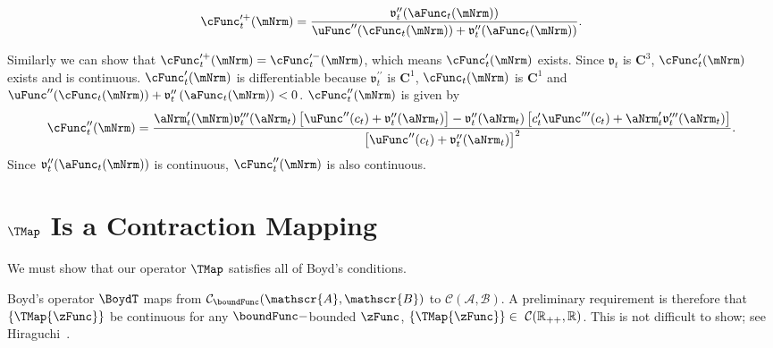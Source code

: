 \documentclass[\econtexRoot/BufferStockTheory]{subfiles}
\begin{document}
\begin{equation*}
  \cFunc_{t}^{\prime +}(\mNrm)=\frac{\mathfrak{v}_{t}^{\prime \prime }({\aFunc}_{t}(\mNrm))}{\uFunc^{\prime \prime
    }(\cFunc_{t}(\mNrm))+\mathfrak{v}_{t}^{\prime \prime }({\aFunc}_{t}(\mNrm))}.
\end{equation*}

Similarly we can show that $\cFunc_{t}^{\prime +}(\mNrm)=\cFunc_{t}^{\prime -}(\mNrm)$,
which means $\cFunc_{t}^{\prime }(\mNrm)$ exists. Since $\mathfrak{v}_{t}$ is
$\mathbf{C}^{3}$, $ \cFunc_{t}^{\prime }(\mNrm)$ exists and is continuous.
$\cFunc_{t}^{\prime }(\mNrm)$ is differentiable because
$\mathfrak{v}_{t}^{\prime \prime }$ is $\mathbf{C}^{1}$, $ \cFunc_{t}(\mNrm)$
is $\mathbf{C}^{1}$ and $\uFunc^{\prime \prime
}(\cFunc_{t}(\mNrm))+\mathfrak{v}_{t}^{\prime \prime }\left( {\aFunc}_{t}(\mNrm)\right)
<0$. $\cFunc_{t}^{\prime \prime }(\mNrm)$ is given by
\begin{equation}
  \cFunc_{t}^{\prime \prime }(\mNrm)=\frac{{\aNrm}_{t}^{\prime }(\mNrm)\mathfrak{v}_{t}^{\prime \prime
      \prime }({\aNrm}_{t})\left[ \uFunc^{\prime \prime }(c_{t})+\mathfrak{v}_{t}^{\prime \prime }({\aNrm}_{t})
    \right] -\mathfrak{v}_{t}^{\prime \prime }({\aNrm}_{t})\left[ c_{t}^{\prime }\uFunc^{\prime \prime
        \prime }(c_{t})+{\aNrm}_{t}^{\prime }\mathfrak{v}_{t}^{\prime \prime \prime }({\aNrm}_{t})\right] }{
    {\left[ \uFunc^{\prime \prime }(c_{t})+\mathfrak{v}_{t}^{\prime \prime }({\aNrm}_{t})\right]}^{2}}.
\end{equation}
Since $\mathfrak{v}_{t}^{\prime \prime }({\aFunc}_{t}(\mNrm))$ is continuous,
$\cFunc_{t}^{\prime \prime }(\mNrm)$ is also continuous.

\hypertarget{It-Is-A-Contraction-Mapping}{}
\section{\texorpdfstring{$\TMap$}{T} Is a Contraction Mapping}\label{sec:Tcomplete}

We must show that our operator $\TMap$ satisfies all of Boyd's
conditions.

Boyd's operator $\BoydT$ maps from $\mathcal{C}_{\boundFunc}(\mathscr{A},\mathscr{B})$ to $\mathcal{C}(\mathscr{A},\mathscr{B})$. A preliminary requirement is therefore that $\{\TMap{\zFunc}\}$ be continuous for any $\boundFunc-$bounded $\zFunc$, $\{\TMap{\zFunc}\}\in~\mathcal{C}(\mathbb{R}_{++},\mathbb{R})$.  This is not difficult to show; see Hiraguchi~\citeyearpar{hiraguchiBSProofs}.
\end{document}
